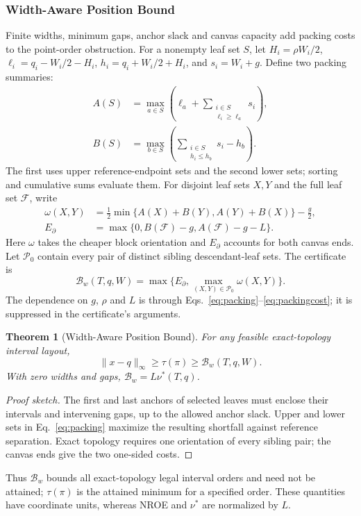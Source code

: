\documentclass[review]{vgtc}
\newtheorem{theorem}{Theorem}
\begin{document}
\subsubsection{Width-Aware Position Bound}
Finite widths, minimum gaps, anchor slack and canvas capacity add packing costs to the point-order obstruction. For a nonempty leaf set $S$, let $H_i=\rho W_i/2$, $\ell_i=q_i-W_i/2-H_i$, $h_i=q_i+W_i/2+H_i$, and $s_i=W_i+g$. Define two packing summaries:
\begin{equation}\label{eq:packing}
\begin{aligned}
 A(S)&=\max_{a\in S}\left(\ell_a+\sum_{\substack{i\in S\\\ell_i\ge\ell_a}}s_i\right),\\
 B(S)&=\max_{b\in S}\left(\sum_{\substack{i\in S\\h_i\le h_b}}s_i-h_b\right).
\end{aligned}
\end{equation}
The first uses upper reference-endpoint sets and the second lower sets; sorting and cumulative sums evaluate them. For disjoint leaf sets $X,Y$ and the full leaf set $\mathcal{F}$, write
\begin{equation}\label{eq:packingcost}
\begin{aligned}
 \omega(X,Y)&=\tfrac12\min\{A(X)+B(Y),A(Y)+B(X)\}-\tfrac g2,\\
 E_\partial&=\max\{0,B(\mathcal{F})-g,A(\mathcal{F})-g-L\}.
\end{aligned}
\end{equation}
Here $\omega$ takes the cheaper block orientation and $E_\partial$ accounts for both canvas ends. Let $\mathcal{P}_0$ contain every pair of distinct sibling descendant-leaf sets. The certificate is
\begin{equation}\label{eq:bwdef}
 \mathcal{B}_w(T,q,W)=\max\{E_\partial,\max_{(X,Y)\in\mathcal{P}_0}\omega(X,Y)\}.
\end{equation}
The dependence on $g$, $\rho$ and $L$ is through Eqs.~\ref{eq:packing}--\ref{eq:packingcost}; it is suppressed in the certificate's arguments.
\begin{theorem}[Width-Aware Position Bound]\label{thm:width}
For any feasible exact-topology interval layout,
\begin{equation}\label{eq:widthbound}
 \|x-q\|_\infty\ge\tau(\pi)\ge\mathcal{B}_w(T,q,W).
\end{equation}
With zero widths and gaps, $\mathcal{B}_w=L\nu^*(T,q)$.
\end{theorem}
\begin{proof}[Proof sketch]
The first and last anchors of selected leaves must enclose their intervals and intervening gaps, up to the allowed anchor slack. Upper and lower sets in Eq.~\ref{eq:packing} maximize the resulting shortfall against reference separation. Exact topology requires one orientation of every sibling pair; the canvas ends give the two one-sided costs.
\end{proof}
Thus $\mathcal{B}_w$ bounds all exact-topology legal interval orders and need not be attained; $\tau(\pi)$ is the attained minimum for a specified order. These quantities have coordinate units, whereas NROE and $\nu^*$ are normalized by $L$.
\end{document}
